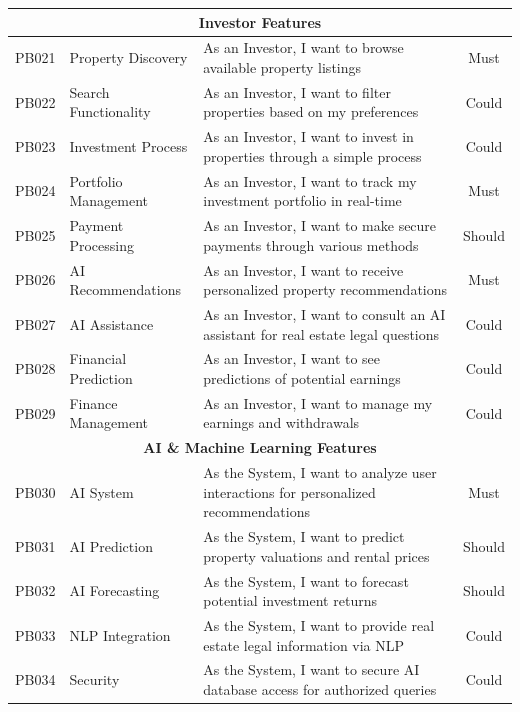 \begin{longtable}{|c|l|p{8cm}|c|}
    \multicolumn{4}{|c|}{\cellcolor{primary!15}\textbf{\textcolor{primary}{Investor Features}}} \\
    \hline
    PB021 & Property Discovery & As an Investor, I want to browse available property listings & Must \\
    \hline
    PB022 & Search Functionality & As an Investor, I want to filter properties based on my preferences & Could \\
    \hline
    PB023 & Investment Process & As an Investor, I want to invest in properties through a simple process & Could \\
    \hline
    PB024 & Portfolio Management & As an Investor, I want to track my investment portfolio in real-time & Must \\
    \hline
    PB025 & Payment Processing & As an Investor, I want to make secure payments through various methods & Should \\
    \hline
    PB026 & AI Recommendations & As an Investor, I want to receive personalized property recommendations & Must \\
    \hline
    PB027 & AI Assistance & As an Investor, I want to consult an AI assistant for real estate legal questions & Could \\
    \hline
    PB028 & Financial Prediction & As an Investor, I want to see predictions of potential earnings & Could \\
    \hline
    PB029 & Finance Management & As an Investor, I want to manage my earnings and withdrawals & Could \\
    \hline
    
    \multicolumn{4}{|c|}{\cellcolor{primary!15}\textbf{\textcolor{primary}{AI \& Machine Learning Features}}} \\
    \hline
    PB030 & AI System & As the System, I want to analyze user interactions for personalized recommendations & Must \\
    \hline
    PB031 & AI Prediction & As the System, I want to predict property valuations and rental prices & Should \\
    \hline
    PB032 & AI Forecasting & As the System, I want to forecast potential investment returns & Should \\
    \hline
    PB033 & NLP Integration & As the System, I want to provide real estate legal information via NLP & Could \\
    \hline
    PB034 & Security & As the System, I want to secure AI database access for authorized queries & Could \\
    \hline
    

\end{longtable}
